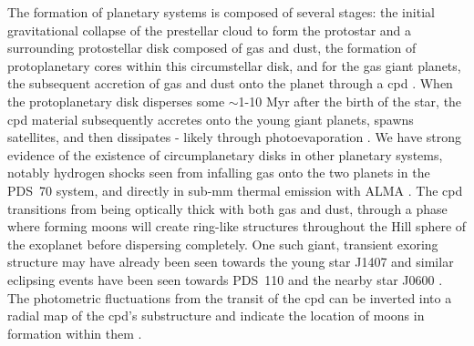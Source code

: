 \documentclass[longauth]{aa} %
\begin{document}
The formation of planetary systems is composed of several stages: the initial gravitational collapse of the prestellar cloud to form the protostar and a surrounding protostellar disk composed of gas and dust, the formation of protoplanetary cores within this circumstellar disk, and for the gas giant planets, the subsequent accretion of gas and dust onto the planet through a \acf{cpd} \citep{Lubow99, Lambrechts12, Mordasini18}.
%
When the protoplanetary disk disperses some $\sim$1-10 Myr after the birth of the star, the \ac{cpd} material subsequently accretes onto the young giant planets, spawns satellites, and then dissipates - likely through photoevaporation \citep[e.g.][]{Mamajek09, Canup02, Oberg20}.
%
We have strong evidence of the existence of circumplanetary disks in other planetary systems, notably hydrogen shocks seen from infalling gas onto the two planets in the PDS~70 \citep{Keppler18,Haffert19} system, and directly in sub-mm thermal emission with ALMA \citep{Isella19}.
%
The \ac{cpd} transitions from being optically thick with both gas and dust, through a phase where forming moons will create ring-like structures throughout the Hill sphere of the exoplanet before dispersing completely.
%
One such giant, transient exoring structure may have already been seen towards the young star J1407 \citep[V1400 Cen;][]{Mamajek12, Kenworthy15} and similar eclipsing events have been seen towards PDS~110 \citep{Osborn17,Osborn19} and the nearby star J0600 \citep{Way19,Way19b}.
%
The photometric fluctuations from the transit of the \ac{cpd} can be inverted into a radial map of the \ac{cpd}'s substructure and  indicate the location of moons in formation within them \citep{Kenworthy15}.
\end{document}
